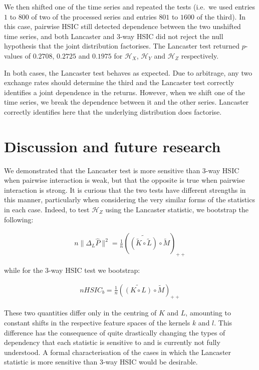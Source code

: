 \documentclass[]{article}
\begin{document}
We then shifted one of the time series and repeated the tests (i.e.~we used entries $1$ to $800$ of two of the processed series and entries $801$ to $1600$ of the third). In this case, pairwise HSIC still detected dependence between the two unshifted time series, and both Lancaster and 3-way HSIC did not reject the null hypothesis that the joint distribution factorises. The Lancaster test returned $p$-values of $0.2708$, $0.2725$ and $0.1975$ for $\mathcal{H}_X$, $\mathcal{H}_Y$ and $\mathcal{H}_Z$ respectively.

In both cases, the Lancaster test behaves as expected. Due to arbitrage, any two exchange rates should determine the third and the Lancaster test correctly identifies a joint dependence in the returns. However, when we shift one of the time series, we break the dependence between it and the other series. Lancaster correctly identifies here that the underlying distribution does factorise.

\section{Discussion and future research}\label{section:discussion}

We demonstrated that the Lancaster test is more sensitive than 3-way HSIC when pairwise interaction is weak, but that the opposite is true when pairwise interaction is strong. It is curious that the two tests have different strengths in this manner, particularly when considering the very similar forms of the statistics in each case. Indeed, to test $\mathcal{H}_Z$ using the Lancaster statistic, we bootstrap the following:

\begin{align*}
n\|\Delta_L\hat{P}\|^2 = \frac{1}{n}\left(\widetilde{\left( \tilde{K} \circ \tilde{L}\right) }\circ \tilde{M} \right)_{++}
\end{align*}

while for the 3-way HSIC test we bootstrap:

\begin{align*}
nHSIC_b = \frac{1}{n}\left(\widetilde{\left( K \circ L\right) }\circ \tilde{M} \right)_{++}
\end{align*}

These two quantities differ only in the centring of $K$ and $L$, amounting to constant shifts in the respective feature spaces of the kernels $k$ and $l$. This difference has the consequence of quite drastically changing the types of dependency that each statistic is sensitive to and is currently not fully understood. A formal characterisation of the cases in which the Lancaster statistic is more sensitive than 3-way HSIC would be desirable.
\end{document}
